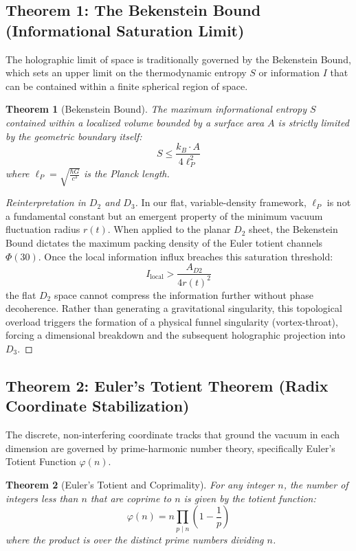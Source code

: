 \documentclass[11pt,a4paper]{article}
\theoremstyle{plain}
\newtheorem{theorem}{Theorem}[section] %
\theoremstyle{definition}
\theoremstyle{remark}
\begin{document}
\subsection{Theorem 1: The Bekenstein Bound (Informational Saturation Limit)}
The holographic limit of space is traditionally governed by the Bekenstein Bound, which sets an upper limit on the thermodynamic entropy $S$ or information $I$ that can be contained within a finite spherical region of space.

\begin{theorem}[Bekenstein Bound]
The maximum informational entropy $S$ contained within a localized volume bounded by a surface area $A$ is strictly limited by the geometric boundary itself:
\begin{equation}
S \le \frac{k_B \cdot A}{4 \ell_P^2}
\end{equation}
where $\ell_P = \sqrt{\frac{\hbar G}{c^3}}$ is the Planck length.
\end{theorem}

\begin{proof}[Reinterpretation in $D_2$ and $D_3$]
In our flat, variable-density framework, $\ell_P$ is not a fundamental constant but an emergent property of the minimum vacuum fluctuation radius $r(t)$. 
When applied to the planar $D_2$ sheet, the Bekenstein Bound dictates the maximum packing density of the Euler totient channels $\Phi(30)$. Once the local information influx breaches this saturation threshold:
\begin{equation}
I_{\text{local}} > \frac{A_{D2}}{4 r(t)^2}
\end{equation}
the flat $D_2$ space cannot compress the information further without phase decoherence. Rather than generating a gravitational singularity, this topological overload triggers the formation of a physical funnel singularity (vortex-throat), forcing a dimensional breakdown and the subsequent holographic projection into $D_3$.
\end{proof}

\subsection{Theorem 2: Euler's Totient Theorem (Radix Coordinate Stabilization)}
The discrete, non-interfering coordinate tracks that ground the vacuum in each dimension are governed by prime-harmonic number theory, specifically Euler's Totient Function $\varphi(n)$.

\begin{theorem}[Euler's Totient and Coprimality]
For any integer $n$, the number of integers less than $n$ that are coprime to $n$ is given by the totient function:
\begin{equation}
\varphi(n) = n \prod_{p \mid n} \left(1 - \frac{1}{p}\right)
\end{equation}
where the product is over the distinct prime numbers dividing $n$.
\end{theorem}
\end{document}
